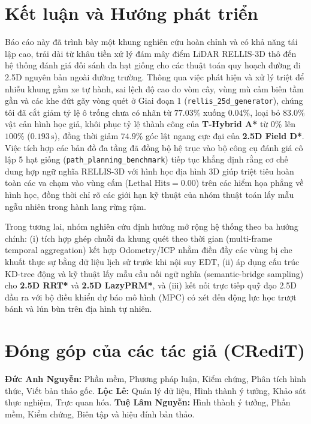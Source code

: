 \documentclass[a4paper,fleqn]{cas-sc}
\begin{document}
\begin{enumerate}
\end{enumerate}

\section{Kết luận và Hướng phát triển}
\label{sec:conclusion}

Báo cáo này đã trình bày một khung nghiên cứu hoàn chỉnh và có khả năng tái lập cao, trải dài từ khâu tiền xử lý đám mây điểm LiDAR RELLIS-3D thô đến hệ thống đánh giá đối sánh đa hạt giống cho các thuật toán quy hoạch đường đi 2.5D nguyên bản ngoài đường trường. Thông qua việc phát hiện và xử lý triệt để nhiễu khung gầm xe tự hành, sai lệch độ cao do vòm cây, vùng mù cảm biến tầm gần và các khe đứt gãy vòng quét ở Giai đoạn 1 (\texttt{rellis\_25d\_generator}), chúng tôi đã cắt giảm tỷ lệ ô trống chưa có nhãn từ $77.03\%$ xuống $0.04\%$, loại bỏ $83.0\%$ vật cản hình học giả, khôi phục tỷ lệ thành công của \textbf{T-Hybrid A*} từ $0\%$ lên $100\%$ ($0.193\,\text{s}$), đồng thời giảm $74.9\%$ góc lật ngang cực đại của \textbf{2.5D Field D*}. Việc tích hợp các bản đồ đa tầng đã đồng bộ hệ trục vào bộ công cụ đánh giá cô lập 5 hạt giống (\texttt{path\_planning\_benchmark}) tiếp tục khẳng định rằng cơ chế dung hợp ngữ nghĩa RELLIS-3D với hình học địa hình 3D giúp triệt tiêu hoàn toàn các va chạm vào vùng cấm ($\text{Lethal Hits} = 0.00$) trên các hiểm họa phẳng về hình học, đồng thời chỉ rõ các giới hạn kỹ thuật của nhóm thuật toán lấy mẫu ngẫu nhiên trong hành lang rừng rậm.

Trong tương lai, nhóm nghiên cứu định hướng mở rộng hệ thống theo ba hướng chính: (i) tích hợp ghép chuỗi đa khung quét theo thời gian (multi-frame temporal aggregation) kết hợp Odometry/ICP nhằm điền đầy các vùng bị che khuất thực sự bằng dữ liệu lịch sử trước khi nội suy EDT, (ii) áp dụng cấu trúc KD-tree động và kỹ thuật lấy mẫu cầu nối ngữ nghĩa (semantic-bridge sampling) cho \textbf{2.5D RRT*} và \textbf{2.5D LazyPRM*}, và (iii) kết nối trực tiếp quỹ đạo 2.5D đầu ra với bộ điều khiển dự báo mô hình (MPC) có xét đến động lực học trượt bánh và lún bùn trên địa hình tự nhiên.

\section*{Đóng góp của các tác giả (CRediT)}
\textbf{Đức Anh Nguyễn:} Phần mềm, Phương pháp luận, Kiểm chứng, Phân tích hình thức, Viết bản thảo gốc. \textbf{Lộc Lê:} Quản lý dữ liệu, Hình thành ý tưởng, Khảo sát thực nghiệm, Trực quan hóa. \textbf{Tuệ Lâm Nguyễn:} Hình thành ý tưởng, Phần mềm, Kiểm chứng, Biên tập và hiệu đính bản thảo.

\renewcommand{\refname}{Tài liệu tham khảo}


\end{document}
